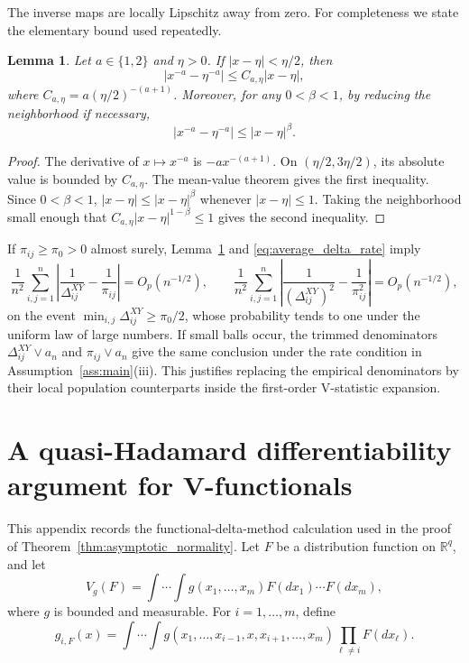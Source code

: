 \documentclass[11pt]{article}
\newtheorem{lemma}[theorem]{Lemma}
\theoremstyle{definition}
\newcommand{\R}{\mathbb{R}}
\begin{document}
The inverse maps are locally Lipschitz away from zero.  For completeness we state the elementary bound used repeatedly.

\begin{lemma}\label{lem:inverse_continuity}
Let \(a\in\{1,2\}\) and \(\eta>0\).  If \(|x-\eta|<\eta/2\), then
\[
|x^{-a}-\eta^{-a}|\le C_{a,\eta}|x-\eta|,
\]
where \(C_{a,\eta}=a(\eta/2)^{-(a+1)}\).  Moreover, for any \(0<\beta<1\), by reducing the neighborhood if necessary,
\[
|x^{-a}-\eta^{-a}|\le |x-\eta|^\beta.
\]
\end{lemma}

\begin{proof}
The derivative of \(x\mapsto x^{-a}\) is \(-a x^{-(a+1)}\).  On \((\eta/2,3\eta/2)\), its absolute value is bounded by \(C_{a,\eta}\).  The mean-value theorem gives the first inequality.  Since \(0<\beta<1\), \(|x-\eta|\le |x-\eta|^\beta\) whenever \(|x-\eta|\le1\).  Taking the neighborhood small enough that \(C_{a,\eta}|x-\eta|^{1-\beta}\le1\) gives the second inequality.
\end{proof}

If \(\pi_{ij}\ge\pi_0>0\) almost surely, Lemma~\ref{lem:inverse_continuity} and \eqref{eq:average_delta_rate} imply
\[
\frac{1}{n^2}\sum_{i,j=1}^n
\left|\frac{1}{\Delta^{XY}_{ij}}-\frac{1}{\pi_{ij}}\right|=O_p(n^{-1/2}),
\qquad
\frac{1}{n^2}\sum_{i,j=1}^n
\left|\frac{1}{(\Delta^{XY}_{ij})^2}-\frac{1}{\pi_{ij}^2}\right|=O_p(n^{-1/2}),
\]
on the event \(\min_{i,j}\Delta^{XY}_{ij}\ge\pi_0/2\), whose probability tends to one under the uniform law of large numbers.  If small balls occur, the trimmed denominators \(\Delta^{XY}_{ij}\vee a_n\) and \(\pi_{ij}\vee a_n\) give the same conclusion under the rate condition in Assumption~\ref{ass:main}(iii).  This justifies replacing the empirical denominators by their local population counterparts inside the first-order V-statistic expansion.

\section{A quasi-Hadamard differentiability argument for V-functionals}\label{app:hadamard}

This appendix records the functional-delta-method calculation used in the proof of Theorem~\ref{thm:asymptotic_normality}.  Let \(F\) be a distribution function on \(\R^q\), and let
\begin{equation}\label{eq:Vg}
V_g(F)=\int\cdots\int g(x_1,\ldots,x_m)F(dx_1)\cdots F(dx_m),
\end{equation}
where \(g\) is bounded and measurable.  For \(i=1,\ldots,m\), define
\[
g_{i,F}(x)=\int\cdots\int g(x_1,\ldots,x_{i-1},x,x_{i+1},\ldots,x_m)
\prod_{\ell\ne i}F(dx_\ell).
\]
\end{document}
